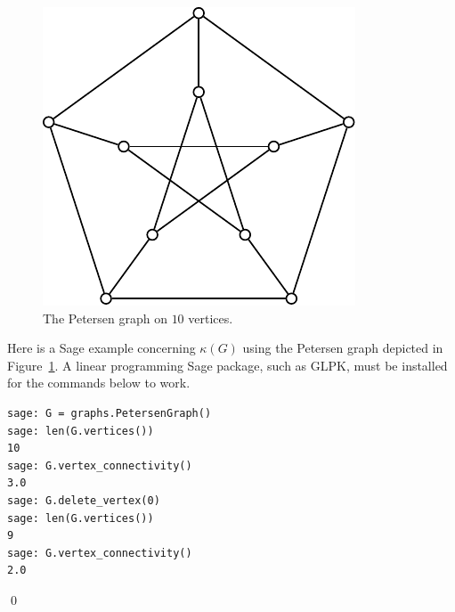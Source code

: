 \begin{figure}[!htbp]
\centering
{}
\includegraphics{image/distance-connectivity/petersen-graph}
\caption{The Petersen graph on $10$ vertices.}
\label{fig:distance_connectivity:petersen_graph}
\end{figure}

\begin{example}
\rm
Here is a Sage example concerning $\kappa(G)$ using the
Petersen graph depicted in
Figure~\ref{fig:distance_connectivity:petersen_graph}. A linear
programming Sage package, such as GLPK, must be installed for the
commands below to work.
\begin{lstlisting}
sage: G = graphs.PetersenGraph()
sage: len(G.vertices())
10
sage: G.vertex_connectivity()
3.0
sage: G.delete_vertex(0)
sage: len(G.vertices())
9
sage: G.vertex_connectivity()
2.0
\end{lstlisting}
\qed
\end{example}

